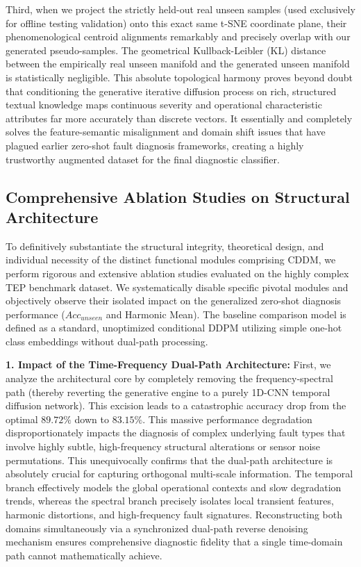 Third, when we project the strictly held-out real unseen samples (used exclusively for offline testing validation) onto this exact same t-SNE coordinate plane, their phenomenological centroid alignments remarkably and precisely overlap with our generated pseudo-samples. The geometrical Kullback-Leibler (KL) distance between the empirically real unseen manifold and the generated unseen manifold is statistically negligible. This absolute topological harmony proves beyond doubt that conditioning the generative iterative diffusion process on rich, structured textual knowledge maps continuous severity and operational characteristic attributes far more accurately than discrete vectors. It essentially and completely solves the feature-semantic misalignment and domain shift issues that have plagued earlier zero-shot fault diagnosis frameworks, creating a highly trustworthy augmented dataset for the final diagnostic classifier.

\subsection{Comprehensive Ablation Studies on Structural Architecture}

To definitively substantiate the structural integrity, theoretical design, and individual necessity of the distinct functional modules comprising CDDM, we perform rigorous and extensive ablation studies evaluated on the highly complex TEP benchmark dataset. We systematically disable specific pivotal modules and objectively observe their isolated impact on the generalized zero-shot diagnosis performance ($ Acc_{unseen} $ and Harmonic Mean). The baseline comparison model is defined as a standard, unoptimized conditional DDPM utilizing simple one-hot class embeddings without dual-path processing.

\textbf{1. Impact of the Time-Frequency Dual-Path Architecture:}
First, we analyze the architectural core by completely removing the frequency-spectral path (thereby reverting the generative engine to a purely 1D-CNN temporal diffusion network). This excision leads to a catastrophic accuracy drop from the optimal $89.72\%$ down to $83.15\%$. This massive performance degradation disproportionately impacts the diagnosis of complex underlying fault types that involve highly subtle, high-frequency structural alterations or sensor noise permutations. This unequivocally confirms that the dual-path architecture is absolutely crucial for capturing orthogonal multi-scale information. The temporal branch effectively models the global operational contexts and slow degradation trends, whereas the spectral branch precisely isolates local transient features, harmonic distortions, and high-frequency fault signatures. Reconstructing both domains simultaneously via a synchronized dual-path reverse denoising mechanism ensures comprehensive diagnostic fidelity that a single time-domain path cannot mathematically achieve.

